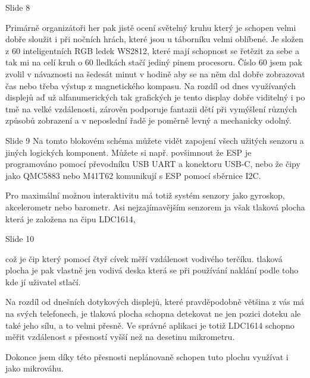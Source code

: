 Slide 8

Primárně organizátoři her pak jistě ocení světelný kruhu který je schopen velmi dobře sloužit i při nočních hrách,
které jsou u táborníku velmi oblíbené.
Je složen z 60 inteligentních RGB ledek WS2812, které mají schopnost se řetězit za sebe a tak mi na celí kruh o 60 lledkách
stačí jediný pinem procesoru. %
Číslo 60 jsem pak zvolil v návaznosti na šedesát 
minut v hodině aby se na něm dal dobře zobrazovat čas nebo třeba výstup z magnetického kompasu. 
Na rozdíl od dnes využívaných displejů aď už alfanumerických tak grafických je tento display dobře viditelný i po tmě na velké vzdálenosti, 
zárověn podporuje fantazii dětí při vymýšlení různých způsobů zobrazení a v neposlední řadě je poměrně levný a mechanicky odolný. 


Slide 9
Na tomto blokovém schéma můžete vidět zapojení všech užitých senzoru a jiných logických komponent.
Můžete si např. povšimnout že ESP je programováno pomocí převodníku USB UART a konektoru USB-C,
nebo že čipy jako QMC5883 nebo M41T62 komunikují s ESP pomocí sběrnice I2C.

Pro maximální možnou interaktivitu má totiž systém senzory jako gyroskop, akcelerometr nebo barometr. 
Asi nejzajímavějším senzorem ja však tlaková plocha která je založena na čipu LDC1614, 


Slide 10

což je čip který 
pomocí čtyř cívek měří vzdálenost vodivého terčíku. tlaková plocha je pak vlastně 
jen vodivá deska která se při používání naklání podle toho kde jí uživatel stlačí. 

Na rozdíl od dnešních dotykových displejů,
které pravděpodobně většina z vás má na svých telefonech, je tlaková plocha schopna detekovat ne jen pozici doteku ale také jeho sílu,
a to velmi přesně. Ve správné aplikaci je totiž LDC1614 schopno měřit vzdálenost s přesností vyšší než na desetinu mikrometru.

Dokonce jsem díky této přesnosti neplánovaně schopen tuto plochu využívat i jako mikrováhu. %

